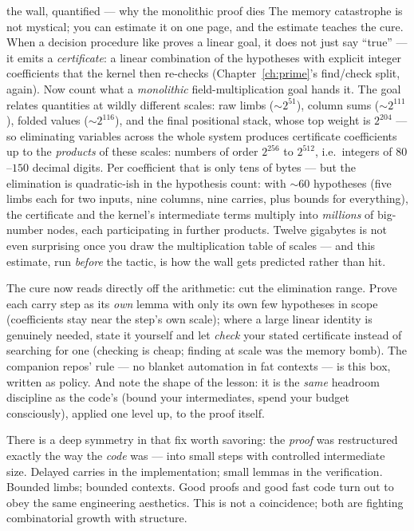 \begin{worked}{the wall, quantified --- why the monolithic proof dies}
The memory catastrophe is not mystical; you can estimate it on one page,
and the estimate teaches the cure. When a decision procedure like
 proves a linear goal, it does not just say ``true'' --- it
emits a \emph{certificate}: a linear combination of the hypotheses with
explicit integer coefficients that the kernel then re-checks
(Chapter~\ref{ch:prime}'s find/check split, again). Now count what a
\emph{monolithic} field-multiplication goal hands it. The goal relates
quantities at wildly different scales: raw limbs ($\sim 2^{51}$), column
sums ($\sim 2^{111}$), folded values ($\sim 2^{116}$), and the final
positional stack, whose top weight is $2^{204}$ --- so eliminating
variables across the whole system produces certificate coefficients up
to the \emph{products} of these scales: numbers of order $2^{256}$ to
$2^{512}$, i.e.\ integers of $80$--$150$ decimal digits. Per
coefficient that is only tens of bytes --- but the elimination is
quadratic-ish in the hypothesis count: with $\sim 60$ hypotheses (five
limbs each for two inputs, nine columns, nine carries, plus bounds for
everything), the certificate and the kernel's intermediate terms
multiply into \emph{millions} of big-number nodes, each participating
in further products. Twelve gigabytes is not even surprising once you
draw the multiplication table of scales --- and this estimate, run
\emph{before} the tactic, is how the wall gets predicted rather than
hit.

The cure now reads directly off the arithmetic: cut the elimination
range. Prove each carry step as its \emph{own} lemma with only its own
few hypotheses in scope (coefficients stay near the step's own scale);
where a large linear identity is genuinely needed, state it yourself
and let  \emph{check} your stated certificate
instead of searching for one (checking is cheap; finding at scale was
the memory bomb). The companion repos' rule --- no blanket automation
in fat contexts --- is this box, written as policy. And note the shape
of the lesson: it is the \emph{same} headroom discipline as the code's
(bound your intermediates, spend your budget consciously), applied one
level up, to the proof itself.
\end{worked}

\begin{aha}
There is a deep symmetry in that fix worth savoring: the \emph{proof} was
restructured exactly the way the \emph{code} was --- into small steps with
controlled intermediate size. Delayed carries in the implementation; small
lemmas in the verification. Bounded limbs; bounded contexts. Good proofs and
good fast code turn out to obey the same engineering aesthetics. This is not
a coincidence; both are fighting combinatorial growth with structure.
\end{aha}

